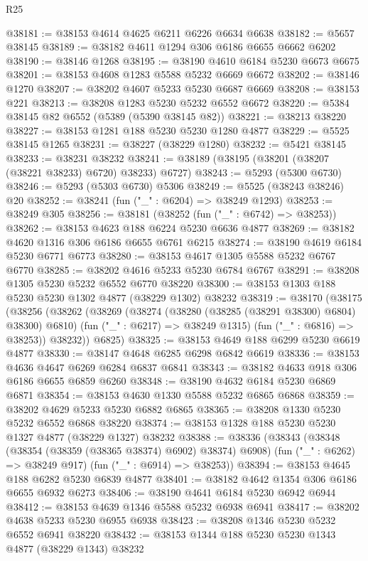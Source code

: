 \begin{lexlean}{R25}
\begin{coremodule}
@38181 := @38153 @4614 @4625 @6211 @6226 @6634 @6638
@38182 := @5657 @38145
@38189 := @38182 @4611 @1294 @306 @6186 @6655 @6662 @6202
@38190 := @38146 @1268
@38195 := @38190 @4610 @6184 @5230 @6673 @6675
@38201 := @38153 @4608 @1283 @5588 @5232 @6669 @6672
@38202 := @38146 @1270
@38207 := @38202 @4607 @5233 @5230 @6687 @6669
@38208 := @38153 @221
@38213 := @38208 @1283 @5230 @5232 @6552 @6672
@38220 := @5384 @38145 @82 @6552 (@5389 (@5390 @38145 @82))
@38221 := @38213 @38220
@38227 := @38153 @1281 @188 @5230 @5230 @1280 @4877
@38229 := @5525 @38145 @1265
@38231 := @38227 (@38229 @1280)
@38232 := @5421 @38145
@38233 := @38231 @38232
@38241 := @38189 (@38195 (@38201 (@38207 (@38221 @38233) @6720) @38233) @6727)
@38243 := @5293 (@5300 @6730)
@38246 := @5293 (@5303 @6730) @5306
@38249 := @5525 (@38243 @38246) @20
@38252 := @38241 (fun ("_" : @6204) => @38249 @1293)
@38253 := @38249 @305
@38256 := @38181 (@38252 (fun ("_" : @6742) => @38253))
@38262 := @38153 @4623 @188 @6224 @5230 @6636 @4877
@38269 := @38182 @4620 @1316 @306 @6186 @6655 @6761 @6215
@38274 := @38190 @4619 @6184 @5230 @6771 @6773
@38280 := @38153 @4617 @1305 @5588 @5232 @6767 @6770
@38285 := @38202 @4616 @5233 @5230 @6784 @6767
@38291 := @38208 @1305 @5230 @5232 @6552 @6770 @38220
@38300 := @38153 @1303 @188 @5230 @5230 @1302 @4877 (@38229 @1302) @38232
@38319 := @38170
    (@38175
      (@38256
        (@38262
          (@38269
            (@38274 (@38280 (@38285 (@38291 @38300) @6804) @38300) @6810)
            (fun ("_" : @6217) => @38249 @1315)
            (fun ("_" : @6816) => @38253))
          @38232))
      @6825)
@38325 := @38153 @4649 @188 @6299 @5230 @6619 @4877
@38330 := @38147 @4648 @6285 @6298 @6842 @6619
@38336 := @38153 @4636 @4647 @6269 @6284 @6837 @6841
@38343 := @38182 @4633 @918 @306 @6186 @6655 @6859 @6260
@38348 := @38190 @4632 @6184 @5230 @6869 @6871
@38354 := @38153 @4630 @1330 @5588 @5232 @6865 @6868
@38359 := @38202 @4629 @5233 @5230 @6882 @6865
@38365 := @38208 @1330 @5230 @5232 @6552 @6868 @38220
@38374 := @38153 @1328 @188 @5230 @5230 @1327 @4877 (@38229 @1327) @38232
@38388 := @38336
    (@38343
      (@38348 (@38354 (@38359 (@38365 @38374) @6902) @38374) @6908)
      (fun ("_" : @6262) => @38249 @917)
      (fun ("_" : @6914) => @38253))
@38394 := @38153 @4645 @188 @6282 @5230 @6839 @4877
@38401 := @38182 @4642 @1354 @306 @6186 @6655 @6932 @6273
@38406 := @38190 @4641 @6184 @5230 @6942 @6944
@38412 := @38153 @4639 @1346 @5588 @5232 @6938 @6941
@38417 := @38202 @4638 @5233 @5230 @6955 @6938
@38423 := @38208 @1346 @5230 @5232 @6552 @6941 @38220
@38432 := @38153 @1344 @188 @5230 @5230 @1343 @4877 (@38229 @1343) @38232

\end{coremodule}
\end{lexlean}
